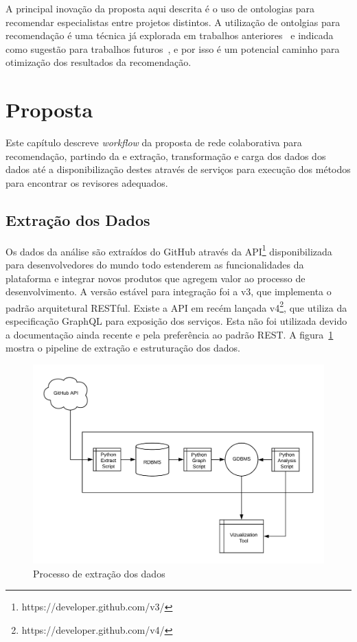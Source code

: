 \documentclass[sigconf]{acmart}
\begin{document}
A principal inovação da proposta aqui descrita é o uso de ontologias para recomendar especialistas entre projetos distintos. A utilização de ontolgias para recomendação é uma técnica já explorada em trabalhos anteriores~\cite{middleton2001,middleton2004} e indicada como sugestão para trabalhos futuros~\cite{adomavicius2005}, e por isso é um potencial caminho para otimização dos resultados da recomendação.


\section{Proposta}\label{cha:proposta}

Este capítulo descreve \textit{workflow} da proposta de rede colaborativa para recomendação, partindo da e extração, transformação e carga dos dados dos dados até a disponibilização destes através de serviços para execução dos métodos para encontrar os revisores adequados.

\subsection{Extração dos Dados}

Os dados da análise são extraídos do GitHub através da API\footnote{https://developer.github.com/v3/} disponibilizada para desenvolvedores do mundo todo estenderem as funcionalidades da plataforma e integrar novos produtos que agregem valor ao processo de desenvolvimento. A versão estável para integração foi a v3, que implementa o padrão arquitetural RESTful\cite{fielding2002}. Existe a API em recém lançada v4\footnote{https://developer.github.com/v4/}, que utiliza da especificação GraphQL para exposição dos serviços. Esta não foi utilizada devido a documentação ainda recente e pela preferência ao padrão REST. A figura~\ref{fig:processo_extracao} mostra o pipeline de extração e estruturação dos dados.

\begin{figure}[!htbp]
 \includegraphics[width=\columnwidth]{processo_extracao}
 \caption{Processo de extração dos dados}\label{fig:processo_extracao}
\end{figure}
\end{document}
